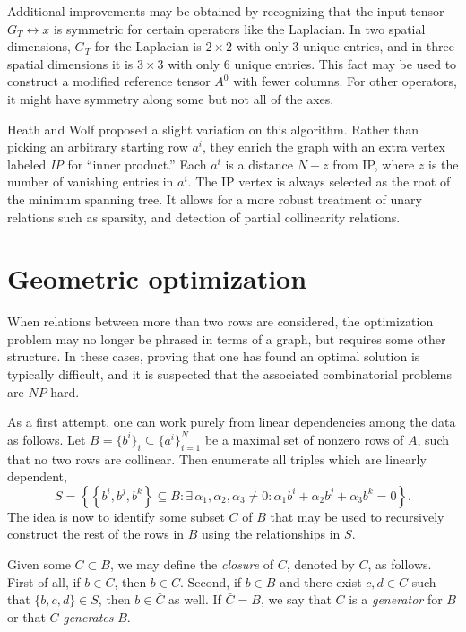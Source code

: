 Additional improvements may be obtained by recognizing that the input
tensor $ G_T \leftrightarrow x $ is symmetric for certain operators
like the Laplacian. In two spatial dimensions, $ G_T $ for the Laplacian
is $ 2 \times 2 $ with only 3 unique entries, and in three spatial
dimensions it is $ 3 \times 3 $ with only 6 unique entries. This fact
may be used to construct a modified reference tensor $ A^0 $ with
fewer columns. For other operators, it might have symmetry along some
but not all of the axes.

Heath and Wolf proposed a slight variation on this algorithm. Rather
than picking an arbitrary starting row $ a^i $, they enrich the graph
with an extra vertex labeled \textit{IP} for ``inner product.''  Each
$ a^i $ is a distance $ N - z $ from IP, where $ z $ is the number of
vanishing entries in $ a^i $. The IP vertex is always selected as the
root of the minimum spanning tree. It allows for a more robust
treatment of unary relations such as sparsity, and detection of
partial collinearity relations.\enlargethispage{15pt}

\vspace*{-3pt}
\section{Geometric optimization}
\label{sec:kirby-4:geom}

When relations between more than two rows are considered, the
optimization problem may no longer be phrased in terms of a graph, but
requires some other structure. In these cases, proving that one has
found an optimal solution is typically difficult, and it is suspected
that the associated combinatorial problems are $ NP $-hard.

As a first attempt, one can work purely from linear dependencies among
the data as follows. Let $ B=\{ b^i \}_i \subseteq \{ a^i \}_{i=1}^N
$ be a maximal set of nonzero rows of $ A $, such that no two rows are
collinear. Then enumerate all triples which are linearly dependent,
\begin{equation}
  S= \left\{ \left\{ b^i , b^j , b^k \right\} \subseteq B:
  \exists \, \alpha_1, \alpha_2, \alpha_3 \neq 0:
  \alpha_1 b^i + \alpha_2 b^j + \alpha_3 b^k = 0 \right\}.
\end{equation}
The idea is now to identify some subset $C$ of $ B $ that may be used
to recursively construct the rest of the rows in $ B $ using the
relationships in $ S $.

Given some $ C \subset B $, we may define the \emph{closure} of $
C $, denoted by $ \bar{C} $, as follows. First of all, if $ b
\in C $, then $ b \in \bar{C} $. Second, if $ b \in B $ and
there exist $ c,d \in \bar{C} $ such that $ \{b,c,d\} \in S $, then $
b \in \bar{C} $ as well. If $ \bar{C} = B$, we say that $ C $ is
a \emph{generator} for $ B $ or that $ C $
\emph{generates} $ B $.


